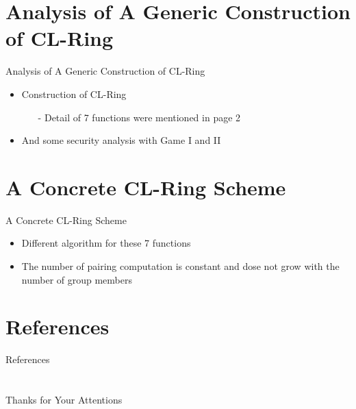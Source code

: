 \documentclass{beamer}
\begin{document}
\section{Analysis of A Generic Construction of CL-Ring}
\begin{frame}{Analysis of A Generic Construction of CL-Ring}
    \begin{itemize}
        \item {Construction of CL-Ring}
        \begin{itemize}
                \item [-]{Detail of 7 functions were mentioned in page 2}
        \end{itemize}
        \item {And some security analysis with Game I and II}
    \end{itemize}
\end{frame}
\section{A Concrete CL-Ring Scheme}
\begin{frame}{A Concrete CL-Ring Scheme}
    \begin{itemize}
        \item {Different algorithm for these 7 functions}
        \item {The number of pairing computation is constant and dose not grow with the number of group members}
    \end{itemize}
\end{frame}
\section{References}
\calcreferencespagetotal %
\begin{frame}[allowframebreaks]{References}
    \fontsize{9pt}{13}\selectfont
    
    
\end{frame}

\section{}

\begin{frame}
    \centering
    \Large{Thanks for Your Attentions}
\end{frame}
\end{document}
